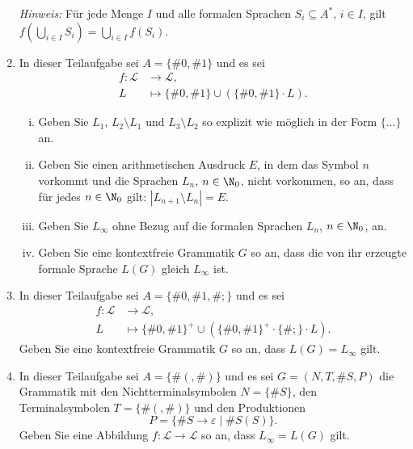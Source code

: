 \documentclass[12pt]{article}
\begin{document}
\begin{aufgabe}[2 + 2 + (2 + 1 + 1 + 2) + 2 + 2 = 14]
\begin{enumerate}
          \emph{Hinweis:} Für jede Menge $I$ und alle formalen Sprachen $S_i \subseteq A^*$, $i \in I$, gilt $f(\bigcup_{i \in I} S_i) = \bigcup_{i \in I} f(S_i)$.
    \item In dieser Teilaufgabe sei $A = \{\#0,\#1\}$ und es sei
          \begin{align*}
            f \colon \mathcal{L} &\to     \mathcal{L},\\
                               L &\mapsto \{\#0,\#1\} \cup (\{\#0,\#1\} \cdot L).
          \end{align*}
          \begin{enumerate}[(i)]
            \item Geben Sie $L_1$, $L_2 \setminus L_1$ und $L_3 \setminus L_2$ so explizit wie möglich in der Form $\{ \dotsc \}$ an.
            \item Geben Sie einen arithmetischen Ausdruck $E$, in dem das Symbol $n$ vorkommt und die Sprachen $L_n$, $n \in \N_0$, nicht vorkommen, so an, dass für jedes $n \in \N_0$ gilt: $|L_{n + 1} \setminus L_n| = E$.
            \item Geben Sie $L_\infty$ ohne Bezug auf die formalen Sprachen $L_n$, $n \in \N_0$, an.
            \item Geben Sie eine kontextfreie Grammatik $G$ so an, dass die von ihr erzeugte formale Sprache $L(G)$ gleich $L_\infty$ ist.
          \end{enumerate}
    \item In dieser Teilaufgabe sei $A = \{\#0,\#1,\#;\}$ und es sei
          \begin{align*}
            f \colon \mathcal{L} &\to     \mathcal{L},\\
                               L &\mapsto \{\#0,\#1\}^+ \cup (\{\#0,\#1\}^+ \cdot \{\#;\} \cdot L).
          \end{align*}
          Geben Sie eine kontextfreie Grammatik $G$ so an, dass $L(G) = L_\infty$ gilt.
    \item In dieser Teilaufgabe sei $A = \{ \#(, \#) \}$ und es sei $G = (N, T, \#S, P)$ die Grammatik mit den Nichtterminalsymbolen $N = \{ \#S \}$, den Terminalsymbolen $T = \{ \#(, \#) \}$ und den Produktionen
          \begin{equation*}
            P = \{ \#S \rightarrow \varepsilon \mid \#{S(S)} \}.
          \end{equation*}
          Geben Sie eine Abbildung $f \colon \mathcal{L} \to \mathcal{L}$ so an, dass $L_\infty = L(G)$ gilt.
  \end{enumerate}
\end{aufgabe}
\end{document}
